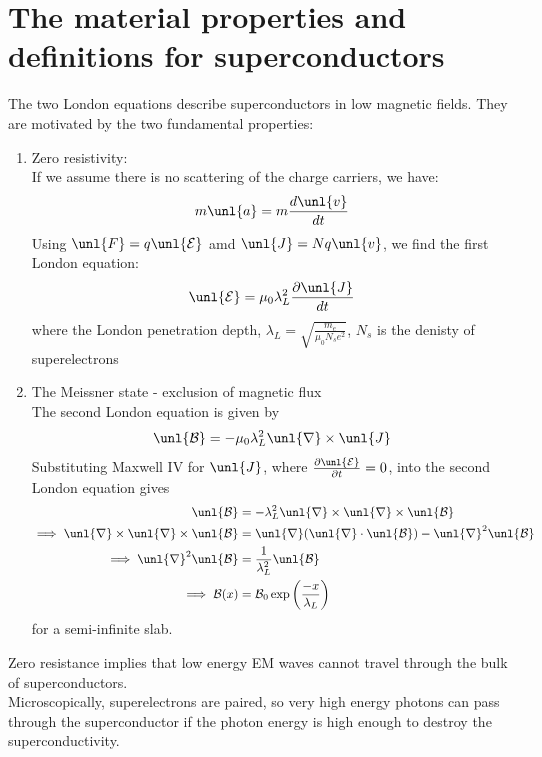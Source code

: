 \documentclass[a4paper, 11pt, normalem]{report}
\newcommand\p{\partial}
\newcommand\E{\mathcal{E}}
\newcommand\uE{\unl{\E}}
\newcommand\B{\mathcal{B}}
\newcommand\uB{\unl{\B}}
\newcommand\del{\unl{\nabla}}
\newcommand\J{\unl{J}}
\newcommand\pen{\lambda_L}
\begin{document}
\section{The material properties and definitions for superconductors}
The two London equations describe superconductors in low magnetic fields.
They are motivated by the two fundamental properties:
\begin{enumerate}
	\item Zero resistivity: \\
	If we assume there is no scattering of the charge carriers, we have:
	\begin{equation}
		m\unl{a} = m\frac{d\unl{v}}{dt}
	\end{equation}
	Using $\unl{F} = q\uE$ amd $\J = Nq\unl{v}$, we find the first London equation:
	\begin{equation}
		\uE = \mu_0\lambda_L^2\frac{\p \J}{dt}
	\end{equation}
	where the London penetration depth, $\pen = \sqrt{\frac{m_e}{\mu_0N_se^2}}$, $N_s$ is the denisty of superelectrons
	\item The Meissner state - exclusion of magnetic flux \\
	The second London equation is given by
	\begin{equation}
		\uB = -\mu_0\pen^2\del\times\J
	\end{equation}
	Substituting Maxwell \RN{4} for $\J$, where $\frac{\p\uE}{\p t} = 0$, into the second London equation gives
	\begin{align}
		\uB &= -\pen^2\del\times\del\times\uB \\
		\implies \del\times\del\times\uB &= \del(\del\cdot\uB) - \del^2\uB \\
		\implies \del^2\uB &= \frac{1}{\pen^2}\uB \\
		\implies \B(x) &= \B_0\exp\left(\frac{-x}{\pen}\right)
	\end{align}
	for a semi-infinite slab.
\end{enumerate}
Zero resistance implies that low energy EM waves cannot travel through the bulk of superconductors. \\
Microscopically, superelectrons are paired, so very high energy photons can pass through the superconductor if the photon energy is high enough to destroy the superconductivity.
\end{document}
